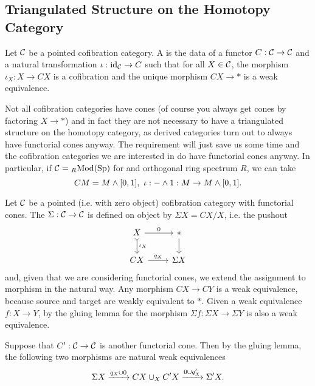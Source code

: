 
\subsection{Triangulated Structure on the Homotopy Category}


\begin{definition}
Let $\mathcal{C}$ be a pointed cofibration category. A  is the data of a functor $C:\mathcal{C}\to\mathcal{C}$ and a natural transformation $\iota:\operatorname{id}_{\mathcal{C}}\to C$ such that for all $X\in\mathcal{C}$, the morphism $\iota_X:X\to CX$ is a cofibration and the unique morphism $CX\to*$ is a weak equivalence.
\end{definition}

\begin{remark}
Not all cofibration categories have  cones (of course you always get cones by factoring $X\to*$) and in fact they are not necessary to have a triangulated structure on the homotopy category, as derived categories turn out to always have functorial cones anyway. The requirement will just save us some time and the cofibration categories we are interested in do have functorial cones anyway. In particular, if $\mathcal{C}={}_{R\!}\operatorname{Mod}({\normalfont\textup{Sp}})$ for and orthogonal ring spectrum $R$, we can take
\[CM=M\smsh[0,1],\ \iota:-\smsh1:M\to M\smsh[0,1].\]
\end{remark}

\begin{construction}
Let $\mathcal{C}$ be a pointed (i.e. with zero object) cofibration category with functorial cones. The  $\Sigma:\mathcal{C}\to\mathcal{C}$ is defined on object by $\Sigma X=CX/X$, i.e. the pushout
\[
\begin{tikzcd}
X \ar[d,tail,"\iota_X"] \ar[r,"0"] & * \ar[d]\\
CX \ar[r,"q_X"] & \Sigma X
\end{tikzcd}
\]
and, given that we are considering functorial cones, we extend the assignment to morphism in the natural way. Any morphism $CX\to CY$ is a weak equivalence, because source and target are weakly equivalent to $*$. Given a weak equivalence $f:X\to Y$, by the gluing lemma for
\medskip
{}
\smallskip\noindent
the morphism $\Sigma f:\Sigma X\to\Sigma Y$ is also a weak equivalence.
\end{construction}

Suppose that $C':\mathcal{C}\to\mathcal{C}$ is another functorial cone. Then by the gluing lemma, the following two morphisms are natural weak equivalences
\[\Sigma X\xrightarrow{q_X\cup0}CX\cup_X C'X\xrightarrow{0\cup q'_X}\Sigma' X.\]

